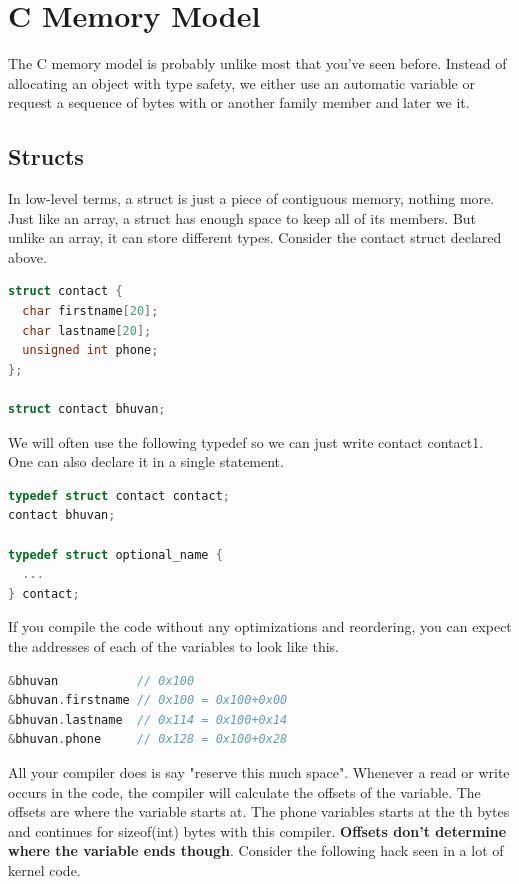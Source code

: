 \section{C Memory Model}

The C memory model is probably unlike most that you've seen before. Instead of allocating an object with type safety, we either use an automatic variable or request a sequence of bytes with  or another family member and later we  it.

\subsection{Structs}

In low-level terms, a struct is just a piece of contiguous memory, nothing more.
Just like an array, a struct has enough space to keep all of its members.
But unlike an array, it can store different types. Consider the contact struct declared above.

\begin{lstlisting}[language=C]
struct contact {
  char firstname[20];
  char lastname[20];
  unsigned int phone;
};

struct contact bhuvan;
\end{lstlisting}

We will often use the following typedef so we can just write contact contact1. One can also declare it in a single statement. 
\begin{lstlisting}[language=C]
typedef struct contact contact;
contact bhuvan;

typedef struct optional_name {
  ...
} contact;
\end{lstlisting}

If you compile the code without any optimizations and reordering, you can expect the addresses of each of the variables to look like this.

\begin{lstlisting}[language=C]
&bhuvan           // 0x100
&bhuvan.firstname // 0x100 = 0x100+0x00
&bhuvan.lastname  // 0x114 = 0x100+0x14
&bhuvan.phone     // 0x128 = 0x100+0x28
\end{lstlisting}

All your compiler does is say "reserve this much space".
Whenever a read or write occurs in the code, the compiler will calculate the offsets of the variable.
The offsets are where the variable starts at.
The phone variables starts at the th bytes and continues for sizeof(int) bytes with this compiler.
\textbf{Offsets don't determine where the variable ends though}.
Consider the following hack seen in a lot of kernel code.


